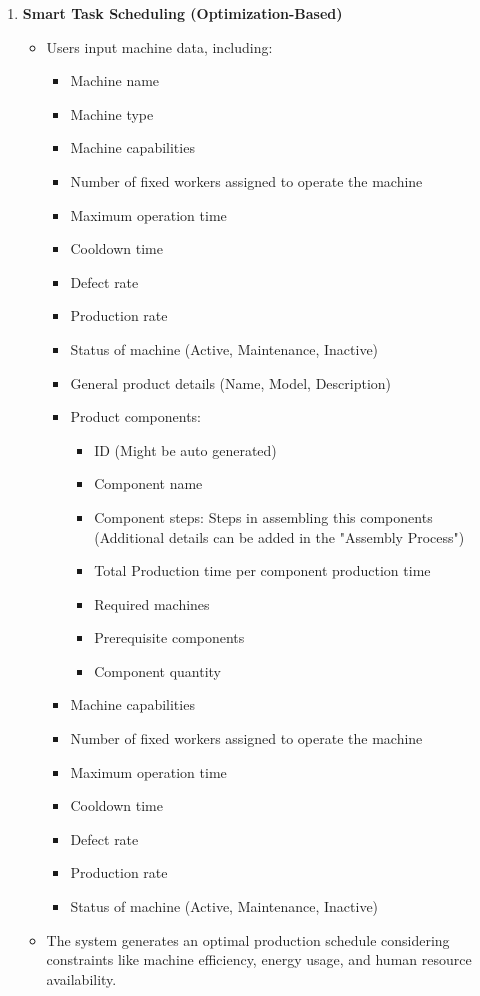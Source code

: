 \begin{enumerate}[leftmargin=80pt]
    \item \textbf{Smart Task Scheduling (Optimization-Based)}
    \begin{itemize}
        \item Users input machine data, including:
        \begin{itemize}
            \item Machine name
            \item Machine type
            \item Machine capabilities
            \item Number of fixed workers assigned to operate the machine
            \item Maximum operation time
            \item Cooldown time
            \item Defect rate
            \item Production rate
            \item Status of machine (Active, Maintenance, Inactive)
        \end{itemize}
        \begin{itemize}
            \item General product details (Name, Model, Description)
            \item Product components:
            \begin{itemize}
                \item ID (Might be auto generated)
                \item Component name
                \item Component steps: Steps in assembling this components (Additional details can be added in the "Assembly Process")
                \item Total Production time per component production time
                \item Required machines
                \item Prerequisite components
                \item Component quantity
            \end{itemize}
            \item Machine capabilities
            \item Number of fixed workers assigned to operate the machine
            \item Maximum operation time
            \item Cooldown time
            \item Defect rate
            \item Production rate
            \item Status of machine (Active, Maintenance, Inactive)
        \end{itemize}
        \item The system generates an optimal production schedule considering constraints like machine efficiency, energy usage, and human resource availability.
    \end{itemize}


\end{enumerate}
